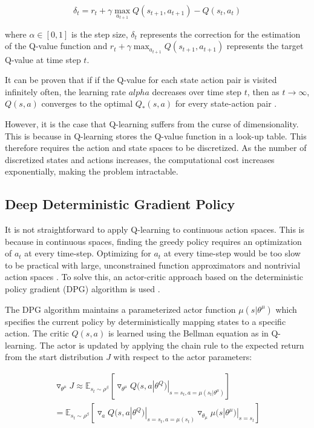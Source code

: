 \documentclass[conference]{IEEEtran}
\begin{document}
\begin{equation}
	\delta_t=r_t+\gamma\max_{a_{t+1}}Q(s_{t+1},a_{t+1})-Q(s_{t},a_t)
\end{equation}

\noindent where $\alpha\in [0,1]$ is the step size, $\delta_t$ represents the correction for the estimation of the Q-value function and $r_t+\gamma\max_{a_{t+1}}Q(s_{t+1},a_{t+1})$ represents the target Q-value at time step $t$.	


It can be proven that if if the Q-value for each state action pair is visited infinitely often, the learning rate $alpha$ decreases over time step $t$, then as $t\rightarrow \infty$, $Q(s,a)$ converges to the optimal $Q_*(s,a)$ for every state-action pair \cite{Gay2007}.

However, it is the case that Q-learning suffers from the curse of dimensionality. This is because in Q-learning stores the Q-value function in a look-up table. This therefore requires the action and state spaces to be discretized. As the number of discretized states and actions increases, the computational cost increases exponentially, making the problem intractable. 

\subsection{Deep Deterministic Gradient Policy}


It is not straightforward to apply Q-learning to continuous action spaces. This is because in continuous spaces, finding the greedy policy requires an optimization of $a_t$ at every time-step. Optimizing for $a_t$ at every time-step would be too slow to be practical with large, unconstrained function approximators and nontrivial action spaces \cite{Hunt2016}. To solve this, an actor-critic approach based on the deterministic policy gradient (DPG) algorithm is used \cite{Silver2014}.


The DPG algorithm maintains a parameterized actor function $\mu(s|\theta^\mu)$ which specifies the current policy by deterministically mapping states to a specific action. The critic $Q(s,a)$ is learned using the Bellman equation as in Q-learning. The actor is updated by applying the chain rule to the expected return from the start distribution $J$ with respect to the actor parameters:

\begin{align}
	\triangledown_{\theta^\mu}J\approx\mathbb{E}_{s_t\sim\rho^\beta}[\triangledown_{\theta^\mu}Q(s,a|\theta^Q)|_{s=s_t,a=\mu(s_t|\theta^\mu)}] \\
	= \mathbb{E}_{s_t\sim\rho^\beta}[\triangledown_aQ(s,a|\theta^Q)|_{s=s_t,a=\mu(s_t)}\triangledown_{\theta_\mu}\mu(s|\theta^\mu)|_{s=s_t}]
\end{align}
  
\end{document}
